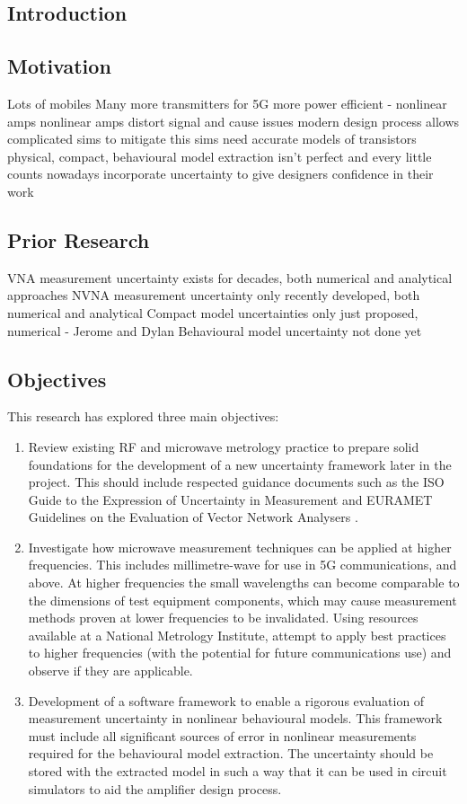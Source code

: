 \documentclass[../thesis/thesis.tex]{subfiles}
\begin{document}
\begin{refsection}
\chapter{Introduction}
\section{Motivation}
Lots of mobiles
Many more transmitters for 5G
more power efficient - nonlinear amps
nonlinear amps distort signal and cause issues
modern design process allows complicated sims to mitigate this
sims need accurate models of transistors
physical, compact, behavioural
model extraction isn't perfect and every little counts nowadays
incorporate uncertainty to give designers confidence in their work

\section{Prior Research}
VNA measurement uncertainty exists for decades, both numerical and analytical approaches
NVNA measurement uncertainty only recently developed, both numerical and analytical
Compact model uncertainties only just proposed, numerical - Jerome and Dylan
Behavioural model uncertainty not done yet
\section{Objectives}
This research has explored three main objectives:
\begin{enumerate}
	\item Review existing RF and microwave metrology practice to prepare solid foundations for the development of a new uncertainty framework later in the project. This should include respected guidance documents such as the ISO Guide to the Expression of Uncertainty in Measurement \cite{GUM_2008} and EURAMET Guidelines on the Evaluation of Vector Network Analysers \cite{EURAMET_2011}.
	\item Investigate how microwave measurement techniques can be applied at higher frequencies. This includes millimetre-wave for use in 5G communications, and above. At higher frequencies the small wavelengths can become comparable to the dimensions of test equipment components, which may cause measurement methods proven at lower frequencies to be invalidated. Using resources available at a National Metrology Institute, attempt to apply best practices to higher frequencies (with the potential for future communications use) and observe if they are applicable.
	\item Development of a software framework to enable a rigorous evaluation of measurement uncertainty in nonlinear behavioural models. This framework must include all significant sources of error in nonlinear measurements required for the behavioural model extraction. The uncertainty should be stored with the extracted model in such a way that it can be used in circuit simulators to aid 
	the amplifier design process.
\end{enumerate}

\end{refsection}
\end{document}
